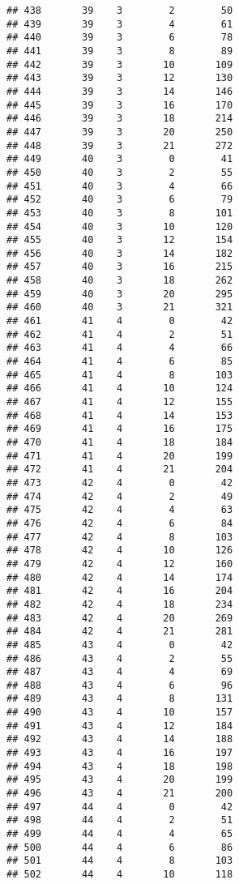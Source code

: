 \documentclass[
]{article}
\begin{document}
\begin{verbatim}
## 438       39    3        2        50
## 439       39    3        4        61
## 440       39    3        6        78
## 441       39    3        8        89
## 442       39    3       10       109
## 443       39    3       12       130
## 444       39    3       14       146
## 445       39    3       16       170
## 446       39    3       18       214
## 447       39    3       20       250
## 448       39    3       21       272
## 449       40    3        0        41
## 450       40    3        2        55
## 451       40    3        4        66
## 452       40    3        6        79
## 453       40    3        8       101
## 454       40    3       10       120
## 455       40    3       12       154
## 456       40    3       14       182
## 457       40    3       16       215
## 458       40    3       18       262
## 459       40    3       20       295
## 460       40    3       21       321
## 461       41    4        0        42
## 462       41    4        2        51
## 463       41    4        4        66
## 464       41    4        6        85
## 465       41    4        8       103
## 466       41    4       10       124
## 467       41    4       12       155
## 468       41    4       14       153
## 469       41    4       16       175
## 470       41    4       18       184
## 471       41    4       20       199
## 472       41    4       21       204
## 473       42    4        0        42
## 474       42    4        2        49
## 475       42    4        4        63
## 476       42    4        6        84
## 477       42    4        8       103
## 478       42    4       10       126
## 479       42    4       12       160
## 480       42    4       14       174
## 481       42    4       16       204
## 482       42    4       18       234
## 483       42    4       20       269
## 484       42    4       21       281
## 485       43    4        0        42
## 486       43    4        2        55
## 487       43    4        4        69
## 488       43    4        6        96
## 489       43    4        8       131
## 490       43    4       10       157
## 491       43    4       12       184
## 492       43    4       14       188
## 493       43    4       16       197
## 494       43    4       18       198
## 495       43    4       20       199
## 496       43    4       21       200
## 497       44    4        0        42
## 498       44    4        2        51
## 499       44    4        4        65
## 500       44    4        6        86
## 501       44    4        8       103
## 502       44    4       10       118

\end{verbatim}
\end{document}
